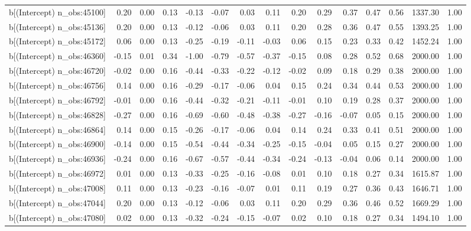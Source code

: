 \begin{table}[ht]
\begin{tabular}{rrrrrrrrrrrrrrr}
  b[(Intercept) n\_obs:45100] & 0.20 & 0.00 & 0.13 & -0.13 & -0.07 & 0.03 & 0.11 & 0.20 & 0.29 & 0.37 & 0.47 & 0.56 & 1337.30 & 1.00 \\ 
  b[(Intercept) n\_obs:45136] & 0.20 & 0.00 & 0.13 & -0.12 & -0.06 & 0.03 & 0.11 & 0.20 & 0.28 & 0.36 & 0.47 & 0.55 & 1393.25 & 1.00 \\ 
  b[(Intercept) n\_obs:45172] & 0.06 & 0.00 & 0.13 & -0.25 & -0.19 & -0.11 & -0.03 & 0.06 & 0.15 & 0.23 & 0.33 & 0.42 & 1452.24 & 1.00 \\ 
  b[(Intercept) n\_obs:46360] & -0.15 & 0.01 & 0.34 & -1.00 & -0.79 & -0.57 & -0.37 & -0.15 & 0.08 & 0.28 & 0.52 & 0.68 & 2000.00 & 1.00 \\ 
  b[(Intercept) n\_obs:46720] & -0.02 & 0.00 & 0.16 & -0.44 & -0.33 & -0.22 & -0.12 & -0.02 & 0.09 & 0.18 & 0.29 & 0.38 & 2000.00 & 1.00 \\ 
  b[(Intercept) n\_obs:46756] & 0.14 & 0.00 & 0.16 & -0.29 & -0.17 & -0.06 & 0.04 & 0.15 & 0.24 & 0.34 & 0.44 & 0.53 & 2000.00 & 1.00 \\ 
  b[(Intercept) n\_obs:46792] & -0.01 & 0.00 & 0.16 & -0.44 & -0.32 & -0.21 & -0.11 & -0.01 & 0.10 & 0.19 & 0.28 & 0.37 & 2000.00 & 1.00 \\ 
  b[(Intercept) n\_obs:46828] & -0.27 & 0.00 & 0.16 & -0.69 & -0.60 & -0.48 & -0.38 & -0.27 & -0.16 & -0.07 & 0.05 & 0.15 & 2000.00 & 1.00 \\ 
  b[(Intercept) n\_obs:46864] & 0.14 & 0.00 & 0.15 & -0.26 & -0.17 & -0.06 & 0.04 & 0.14 & 0.24 & 0.33 & 0.41 & 0.51 & 2000.00 & 1.00 \\ 
  b[(Intercept) n\_obs:46900] & -0.14 & 0.00 & 0.15 & -0.54 & -0.44 & -0.34 & -0.25 & -0.15 & -0.04 & 0.05 & 0.15 & 0.27 & 2000.00 & 1.00 \\ 
  b[(Intercept) n\_obs:46936] & -0.24 & 0.00 & 0.16 & -0.67 & -0.57 & -0.44 & -0.34 & -0.24 & -0.13 & -0.04 & 0.06 & 0.14 & 2000.00 & 1.00 \\ 
  b[(Intercept) n\_obs:46972] & 0.01 & 0.00 & 0.13 & -0.33 & -0.25 & -0.16 & -0.08 & 0.01 & 0.10 & 0.18 & 0.27 & 0.34 & 1615.87 & 1.00 \\ 
  b[(Intercept) n\_obs:47008] & 0.11 & 0.00 & 0.13 & -0.23 & -0.16 & -0.07 & 0.01 & 0.11 & 0.19 & 0.27 & 0.36 & 0.43 & 1646.71 & 1.00 \\ 
  b[(Intercept) n\_obs:47044] & 0.20 & 0.00 & 0.13 & -0.12 & -0.06 & 0.03 & 0.11 & 0.20 & 0.29 & 0.36 & 0.46 & 0.52 & 1669.29 & 1.00 \\ 
  b[(Intercept) n\_obs:47080] & 0.02 & 0.00 & 0.13 & -0.32 & -0.24 & -0.15 & -0.07 & 0.02 & 0.10 & 0.18 & 0.27 & 0.34 & 1494.10 & 1.00 \\ 

\end{tabular}
\end{table}
